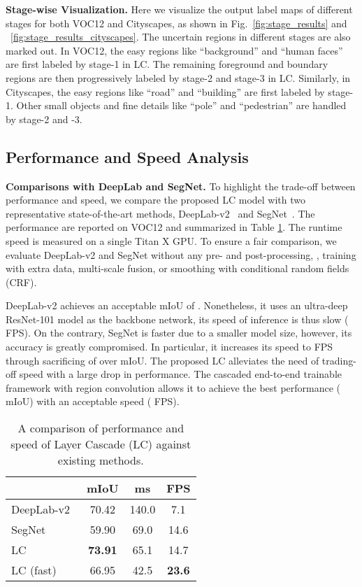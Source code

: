 \documentclass[10pt,twocolumn,letterpaper]{article}
\begin{document}
\noindent
\textbf{Stage-wise Visualization.}
Here we visualize the output label maps of different stages for both VOC12 and Cityscapes, as shown in Fig.~\ref{fig:stage_results} and ~\ref{fig:stage_results_cityscapes}.
The uncertain regions in different stages are also marked out.
In VOC12, the easy regions like ``background'' and ``human faces'' are first labeled by stage-1 in LC.
The remaining foreground and boundary regions are then progressively labeled by stage-2 and stage-3 in LC. 
Similarly, in Cityscapes, the easy regions like ``road'' and ``building'' are first labeled by stage-1.
Other small objects and fine details like ``pole'' and ``pedestrian'' are handled by stage-2 and -3.

\subsection{Performance and Speed Analysis}



\noindent
\textbf{Comparisons with DeepLab and SegNet.}
To highlight the trade-off between performance and speed, we compare the proposed LC model with two representative state-of-the-art methods, DeepLab-v2~\cite{CP2016Deeplab} and SegNet~\cite{badrinarayanan2015segnet}.
The performance are reported on VOC12 and summarized in Table \ref{tab:region_conv}. The runtime speed is measured on a single Titan X GPU.
To ensure a fair comparison, we evaluate DeepLab-v2 and SegNet without any pre- and post-processing, \eg, training with extra data, multi-scale fusion, or smoothing with conditional random fields (CRF).

DeepLab-v2 achieves an acceptable mIoU of .
Nonetheless, it uses an ultra-deep ResNet-101 model as the backbone network, its speed of inference is thus slow ( FPS).
On the contrary, SegNet is faster due to a smaller model size, however, its accuracy is greatly compromised. In particular, it increases its speed to  FPS through sacrificing of over  mIoU.
The proposed LC alleviates the need of trading-off speed with a large drop in performance. The cascaded end-to-end trainable framework with region convolution allows it to achieve the best performance ( mIoU) with an acceptable speed ( FPS).

\begin{table}[t]
    \small
\caption{A comparison of performance and speed of Layer Cascade (LC) against existing methods.}
    \centering
    \begin{tabular}{l|c|c|c}
        \hline
        &mIoU&ms&FPS\\
        \hline\hline
        DeepLab-v2~\cite{CP2016Deeplab}&70.42&140.0&7.1\\
        SegNet~\cite{badrinarayanan2015segnet}&59.90&69.0&14.6\\
        \hline\hline    
        LC &\textbf{73.91}&65.1&14.7\\
        LC (fast)&66.95&42.5&\textbf{23.6}\\
        \hline
    \end{tabular}
    \label{tab:region_conv}
\end{table}
\end{document}
